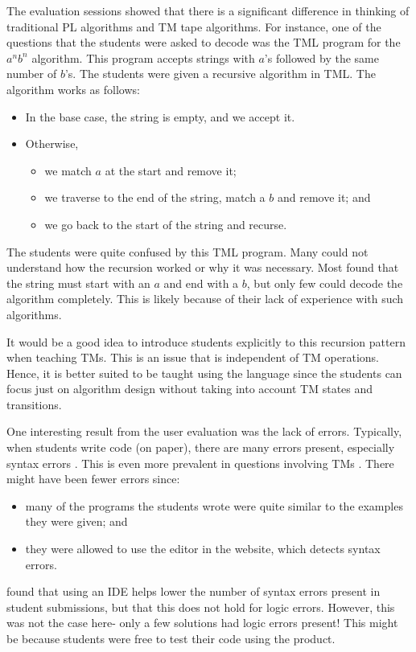 The evaluation sessions showed that there is a significant difference in thinking of traditional PL algorithms and TM tape algorithms. For instance, one of the questions that the students were asked to decode was the TML program for the $a^n b^n$ algorithm. This program accepts strings with $a$'s followed by the same number of $b$'s. The students were given a recursive algorithm in TML. The algorithm works as follows:
\begin{itemize}
    \item In the base case, the string is empty, and we accept it.
    \item Otherwise, 
    \begin{itemize}
        \item we match $a$ at the start and remove it;
        \item we traverse to the end of the string, match a $b$ and remove it; and
        \item we go back to the start of the string and recurse.
    \end{itemize}
\end{itemize}
The students were quite confused by this TML program. Many could not understand how the recursion worked or why it was necessary. Most found that the string must start with an $a$ and end with a $b$, but only few could decode the algorithm completely. This is likely because of their lack of experience with such algorithms. 

It would be a good idea to introduce students explicitly to this recursion pattern when teaching TMs. This is an issue that is independent of TM operations. Hence, it is better suited to be taught using the language since the students can focus just on algorithm design without taking into account TM states and transitions.

One interesting result from the user evaluation was the lack of errors. Typically, when students write code (on paper), there are many errors present, especially syntax errors \citep{corley2020paper}. This is even more prevalent in questions involving TMs \citep{rodger2006jflap}. There might have been fewer errors since:
\begin{itemize}
    \item many of the programs the students wrote were quite similar to the examples they were given; and
    \item they were allowed to use the editor in the website, which detects syntax errors.
\end{itemize}
\citet{corley2020paper} found that using an IDE helps lower the number of syntax errors present in student submissions, but that this does not hold for logic errors. However, this was not the case here- only a few solutions had logic errors present! This might be because students were free to test their code using the product.

